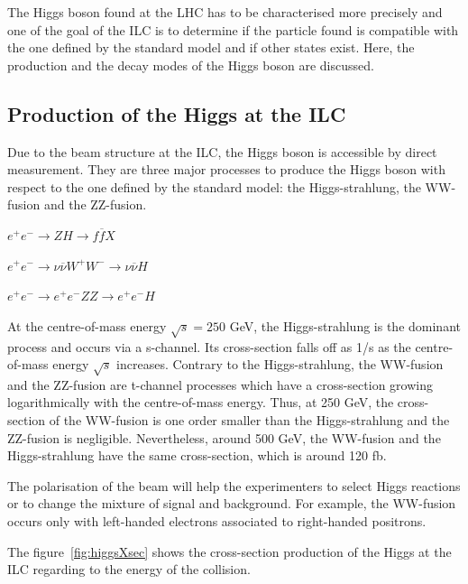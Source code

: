   The Higgs boson found at the \gls{LHC} has to be characterised more precisely and one of the goal of the \gls{ILC} is to determine if the particle found is compatible with the one defined by the standard model and if other states exist.
  Here, the production and the decay modes of the Higgs boson are discussed.

  \subsection{Production of the Higgs at the ILC}

  Due to the beam structure at the \gls{ILC}, the Higgs boson is accessible by direct measurement.
  They are three major processes to produce the Higgs boson with respect to the one defined by the standard model: the Higgs-strahlung, the WW-fusion and the ZZ-fusion.

  \begin{description}
    \centering
    \item[Higgs-strahlung:] $e^+e^- \rightarrow ZH \rightarrow f\overline{f}X$
    \item[WW-fusion:] $e^+e^- \rightarrow \nu \overline{\nu} W^+W^- \rightarrow \nu \overline{\nu} H$
    \item[ZZ-fusion:] $e^+e^- \rightarrow e^+e^- ZZ \rightarrow e^+e^- H$
  \end{description}

  At the centre-of-mass energy $\sqrt{s} = 250$ GeV, the Higgs-strahlung is the dominant process and occurs via a s-channel. 
  Its cross-section falls off as 1/s as the centre-of-mass energy $\sqrt{s}$ increases.
  Contrary to the Higgs-strahlung, the WW-fusion and the ZZ-fusion are t-channel processes which have a cross-section growing logarithmically with the centre-of-mass energy.
  Thus, at 250 GeV, the cross-section of the WW-fusion is one order smaller than the Higgs-strahlung and the ZZ-fusion is negligible. 
  Nevertheless, around 500 GeV, the WW-fusion and the Higgs-strahlung have the same cross-section, which is around 120 fb.

  The polarisation of the beam will help the experimenters to select Higgs reactions or to change the mixture of signal and background.
  For example, the WW-fusion occurs only with left-handed electrons associated to right-handed positrons. 

  The figure~\ref{fig:higgsXsec} shows the cross-section production of the Higgs at the ILC regarding to the energy of the collision.
  
